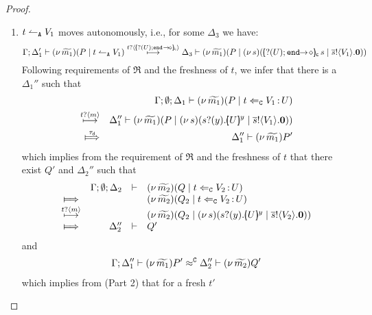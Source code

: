 \begin{proof}
\begin{enumerate}[1.]
\begin{enumerate}
					\item	%
						$t \leftharpoonup_\mathtt{A} V_1$ moves autonomously, i.e., for some $\Delta_3$ we have:
						\[
							\horel{\Gamma}{\Delta_1'}{\newsp{\widetilde{m_1}}{P \Par \ntrigger{t}{V_1}}}
							{\hby{\bactinp{t}{\omapchar{\shot{\btinp{U} \tinact~}}}}}
							{\Delta_3}{\newsp{\widetilde{m_1}}{P \Par \newsp{s}{ \appl{\omapchar{\shot{\btinp{U} \tinact}}}{s} \Par \bout{\dual{s}}{V_1} \inact}}}
						\]
							Following requirements of $\Re$ and the freshness of $t$,
							we infer that there is a $\Delta_1''$ such that
						\begin{eqnarray*}
							&& \Gamma; \es; \Delta_1 \proves \newsp{\widetilde{m_1}}{P \Par \ftrigger{t}{V_1}{U}}\\
							\hby{\bactinp{t}{m}} &&
							\Delta_1'' \proves \newsp{\widetilde{m_1}}{P \Par \newsp{s}{\binp{s}{y} \mapchar{U}{y} \Par \bout{\dual{s}}{V_1} \inact}}\\
							\Hby{\dtau} &&
							\Delta_1'' \proves \news{\widetilde{m_1}}P'
						\end{eqnarray*}
							which implies from the  requirement of $\Re$ and
							the freshness of $t$ that there exist $Q'$ and $\Delta_2''$ such that
							\begin{eqnarray}
								\begin{array}{crll}
									& \Gamma; \es; \Delta_2 & \proves &		
									\newsp{\widetilde{m_2}}{Q \Par \ftrigger{t}{V_2}{U}}
									\\
									\Hby{} &&&
									\newsp{\widetilde{m_2}}{Q_2 \Par \ftrigger{t}{V_2}{U}}
									\\
									{\hby{\bactinp{t}{m}}}& & &
									\newsp{\widetilde{m_2}}{Q_2 \Par \newsp{s}{\binp{s}{y} \mapchar{U}{y} \Par \bout{\dual{s}}{V_2} \inact}}
									\\
									\Hby{} & \Delta_2'' & \proves & Q'
								\end{array}
								\label{proof:trig_equiv2}
							\end{eqnarray}
							and
							\begin{eqnarray*}
								\Gamma; \Delta_1'' \vdash (\nu\, \widetilde{m_1})P' \approx^\mathtt{C} \Delta_2'' \vdash (\nu\, \widetilde{m_2})Q'
							\end{eqnarray*}
							which implies from  (Part 2) that
							for a fresh $t'$

\end{enumerate}
\end{enumerate}
\end{proof}
